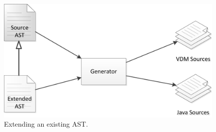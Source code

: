 

\begin{figure}[hpt]
\centering
\includegraphics[width=.5\textwidth]{figures/ASTgenerator_extend}
\caption{Extending an existing AST.\label{fig:ASTgenExtend}}
\end{figure}

